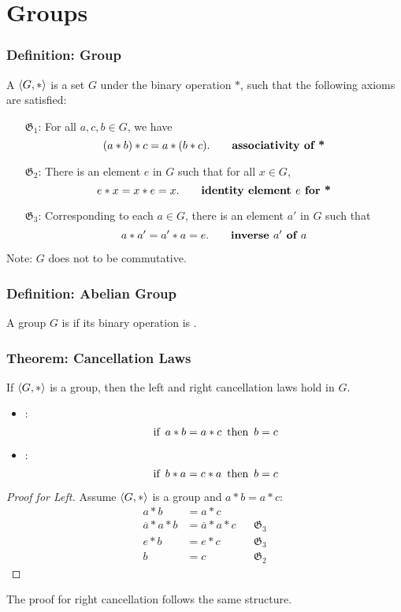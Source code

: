 \section{Groups}

\subsubsection*{Definition: Group}
A  $\langle G,* \rangle$ is a set $G$  under the binary operation $*$, such that the following axioms are satisfied:
\begin{enumerate}
    \item[$\mathfrak{G}_1$:] For all $a,c,b \in G$, we have
    \[
        (a*b)*c = a*(b*c). \qquad \textbf{associativity of *}
    \]
    \item[$\mathfrak{G}_2$:] There is an element $e$ in $G$ such that for all $x \in G$,
    \[
        e*x=x*e=x. \qquad \textbf{identity element $e$ for *}
    \]
    \item[$\mathfrak{G}_3$:] Corresponding to each $a \in G$, there is an element $a'$ in $G$ such that
    \[
        a*a'=a'*a=e. \qquad \textbf{inverse $a'$ of $a$}
    \]
\end{enumerate}
Note: $G$ does not  to be commutative.

\subsubsection*{Definition: Abelian Group}
A group $G$ is  if its binary operation is .

\subsubsection*{Theorem: Cancellation Laws}
If $\langle G, * \rangle$ is a group, then the left and right cancellation laws hold in $G$.
\begin{itemize}
    \item {}:
    \[
        \operatorname{~\text{if}~} a*b = a*c \operatorname{~\text{then}~} b = c
    \]
    \item {}:
    \[
        \operatorname{~\text{if}~} b*a = c*a \operatorname{~\text{then}~} b = c
    \]
\end{itemize}
\begin{proof}[Proof for Left]
    Assume $\langle G,* \rangle$ is a group and $a*b=a*c$:
    \begin{align*}
        a*b & = a*c \\
        \overline{a}*a*b & = \overline{a}*a*c && \mathfrak{G}_3 \\
        e*b & = e*c && \mathfrak{G}_3 \\
        b & = c && \mathfrak{G}_2
    \end{align*}
\end{proof}
The proof for right cancellation follows the same structure.

